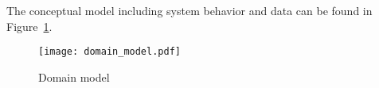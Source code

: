 The conceptual model including system behavior and data can be found in~%
Figure~\ref{fig:domain_model}.
\begin{figure}[]
	\centering
	\caption{Domain model}\label{fig:domain_model}
	\texttt{[image: domain\_model.pdf]}
\end{figure}
